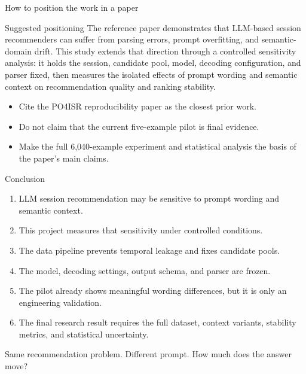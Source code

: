 \documentclass[aspectratio=169,12pt]{beamer}
\begin{document}
\begin{frame}{How to position the work in a paper}
\begin{block}{Suggested positioning}
The reference paper demonstrates that LLM-based session recommenders can suffer
from parsing errors, prompt overfitting, and semantic-domain drift. This study
extends that direction through a controlled sensitivity analysis: it holds the
session, candidate pool, model, decoding configuration, and parser fixed, then
measures the isolated effects of prompt wording and semantic context on
recommendation quality and ranking stability.
\end{block}

\vspace{0.6em}
\begin{itemize}
  \item Cite the PO4ISR reproducibility paper as the closest prior work.
  \item Do not claim that the current five-example pilot is final evidence.
  \item Make the full 6,040-example experiment and statistical analysis the
        basis of the paper's main claims.
\end{itemize}
\end{frame}

\begin{frame}{Conclusion}
\begin{enumerate}
  \item LLM session recommendation may be sensitive to prompt wording and
        semantic context.
  \item This project measures that sensitivity under controlled conditions.
  \item The data pipeline prevents temporal leakage and fixes candidate pools.
  \item The model, decoding settings, output schema, and parser are frozen.
  \item The pilot already shows meaningful wording differences, but it is only
        an engineering validation.
  \item The final research result requires the full dataset, context variants,
        stability metrics, and statistical uncertainty.
\end{enumerate}

\vspace{0.7em}
\centering
\Large\textcolor{DeepBlue}{Same recommendation problem. Different prompt.
How much does the answer move?}
\end{frame}
\end{document}
